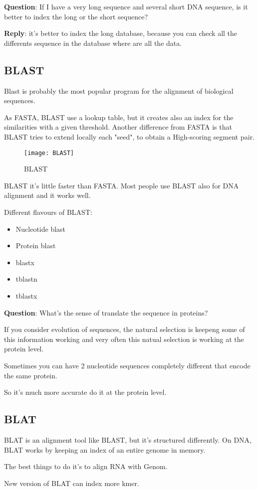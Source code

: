 \textbf{Question}: If I have a very long sequence and several short DNA
sequence, is it better to index the long or the short sequence?
 
\textbf{Reply}: it's better to index
the long database, because you can check all the differents sequence in the
database where are all the data.

\subsection{BLAST}

Blast is probably the most popular program for the alignment of biological
sequences.

As FASTA, BLAST use a lookup table, but it creates also an index for the
similarities with a given threshold. Another difference from FASTA is that
BLAST tries to extend locally each "seed", to obtain a High-scoring segment
pair.

\begin{figure}[H]
  \centering
  \texttt{[image: BLAST]}
  \caption{BLAST}
\end{figure}

BLAST it's little faster than FASTA. Most people use BLAST also for DNA
alignment and it works well.

Different flavours of BLAST:
\begin{itemize}
  \item Nucleotide blast
  \item Protein blast
  \item blastx
  \item tblastn
  \item tblastx
\end{itemize}

\textbf{Question}: What's the sense of translate the sequence in proteins?

If you consider evolution of sequences, the natural selection is keepeng
some of this information working and very often this natual selection is
working at the protein level. 

Sometimes you can have 2 nucleotide sequences completely different that
encode the same protein. 

So it's much more accurate do it at the protein level.

\subsection{BLAT}

BLAT is an alignment tool like BLAST, but it's structured differently. On DNA,
BLAT works by keeping an index of an entire genome in memory.

The best things to do it's to align RNA with Genom.

New version of BLAT can index more kmer.
